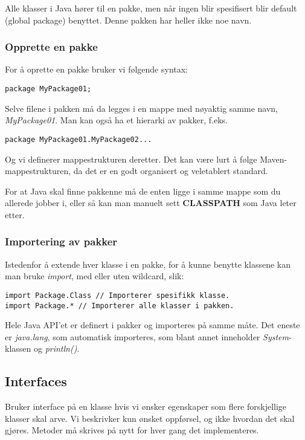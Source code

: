 \documentclass[a4paper,norsk,10pt]{article}
\begin{document}
Alle klasser i Java hører til en pakke, men når ingen blir spesifisert
blir default (global package) benyttet. Denne pakken har heller ikke
noe navn.
\subsubsection{Opprette en pakke}
\label{sec-16.1.1}

For å oprette en pakke bruker vi følgende syntax:

\begin{verbatim}
package MyPackage01;
\end{verbatim}

Selve filene i pakken må da legges i en mappe med nøyaktig samme navn,
\emph{\/MyPackage01\/}. Man kan også ha et hierarki av pakker, f.eks. 

\begin{verbatim}
package MyPackage01.MyPackage02...
\end{verbatim}

Og vi definerer mappestrukturen deretter. Det kan være lurt å følge
Maven-mappestrukturen, da det er en godt organisert og veletablert
standard. 

For at Java skal finne pakkenne må de enten ligge i samme mappe som du
allerede jobber i, eller så kan man manuelt sett \textbf{CLASSPATH} som Java
leter etter.
\subsubsection{Importering av pakker}
\label{sec-16.1.2}

Istedenfor å extende hver klasse i en pakke, for å kunne benytte
klassene kan man bruke \emph{import}, med eller uten wildcard, slik:

\begin{verbatim}
import Package.Class // Importerer spesifikk klasse.
import Package.* // Importerer alle klasser i pakken.
\end{verbatim}

Hele Java API'et er definert i pakker og importeres på samme måte. Det
eneste er \emph{java.lang}, som automatisk importeres, som blant annet
inneholder \emph{System}-klassen og \emph{println()}.
\subsection{Interfaces}
\label{sec-16.2}

Bruker interface på en klasse hvis vi ønsker egenskaper som flere
forskjellige klasser skal arve. Vi beskrivker kun ønsket oppførsel, og
ikke hvordan det skal gjøres. Metoder må skrives på nytt for hver
gang det implementeres. 
\end{document}

